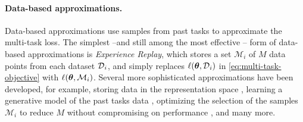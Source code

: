 \documentclass{article} %
\newcommand{\memory}{\mathcal{M}}
\begin{document}
\paragraph{Data-based approximations.} 
 Data-based approximations use samples from past tasks to approximate the multi-task loss. The simplest --and still among the most effective \citep{buzzega_rethinking_2021} -- form of data-based approximations is \emph{Experience Replay}, which stores a set $\memory_i$ of $M$ data points from each dataset $\mbox{${\cal D}$}_i$, and simply replaces $\ell(\mbox{$\mbox{$\boldsymbol{\theta}$}$}, \mbox{${\cal D}$}_i)$ in \cref{eq:multi-task-objective} with $\loss(\vparam, \memory_i)$. Several more sophisticated approximations have been developed, for example, storing data in the representation space \citep{rebuffi_icarl_2017}, learning a generative model of the past tasks data \citep{shin_continual_2017,van_de_ven_generative_2018}, optimizing the selection of the samples $\memory_i$ to reduce $M$ without compromising on performance \citep{yoon_online_2021}, and many more.  
\end{document}
